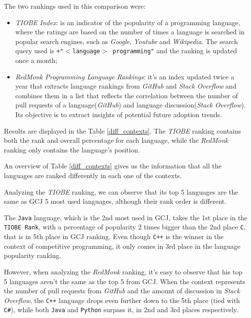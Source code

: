 \documentclass{article}
\begin{document}
\begin{multicols*}{2}
The two rankings used in this comparison were:
\begin{itemize}
    \item \textit{TIOBE Index}: is an indicator of the popularity of a programming language\cite{tiobe}, where the ratings are based on the number of times a language is searched in popular search engines, such as \textit{Google}, \textit{Youtube} and \textit{Wikipedia}. The search query used is \texttt{+"$<$language$>$ programming"} and the ranking is updated once a month;
    \item \textit{RedMonk Programming Language Rankings}: it's an index updated twice a year that extracts language rankings from \textit{GitHub} and \textit{Stack Overflow} and combines them in a list that reflects the correlation between the number of pull requests of a language(\textit{GitHub}) and language discussion(\textit{Stack Overflow})\cite{redmonk}. Its objective is to extract insights of potential future adoption trends.
\end{itemize}


Results are displayed in the Table \ref{diff_contexts}. The \textit{TIOBE} ranking contains both the rank and overall percentage for each language, while the \textit{RedMonk} ranking only contains the language's position.

An overview of Table \ref{diff_contexts} gives us the information that all the languages are ranked differently in each one of the contexts.


Analyzing the \textit{TIOBE} ranking, we can observe that its top 5 languages are the same as GCJ 5 most used languages, although their rank order is different.

The \texttt{Java} language, which is the 2nd most used in GCJ, takes the 1st place in the \texttt{TIOBE Rank}, with a percentage of popularity 2 times bigger than the 2nd place \texttt{C}, that is in 5th place in GCJ ranking. Even though \texttt{C++} is the winner in the context of competitive programming, it only comes in 3rd place in the language popularity ranking.


However, when analyzing the \textit{RedMonk} ranking, it's easy to observe that his top 5 languages aren't the same as the top 5 from GCJ. When the context represents the number of pull requests from \textit{GitHub} and the amount of discussion in \textit{Stack Overflow}, the \texttt{C++} language drops even further down to the 5th place (tied with \texttt{C\#}), while both \texttt{Java} and \texttt{Python} surpass it, in 2nd and 3rd places respectively.


\end{multicols*}
\end{document}
